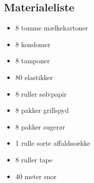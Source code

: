\subsection{Materialeliste}

\begin{itemize}
  \item 8 tomme mælkekartoner
  \item 8 kondomer
  \item 8 tamponer
  \item 80 elastikker
  \item 8 ruller sølvpapir
  \item 8 pakker grillspyd
  \item 8 pakker sugerør
  \item 1 rulle sorte affaldssække
  \item 8 ruller tape
  \item 40 meter snor
\end{itemize}